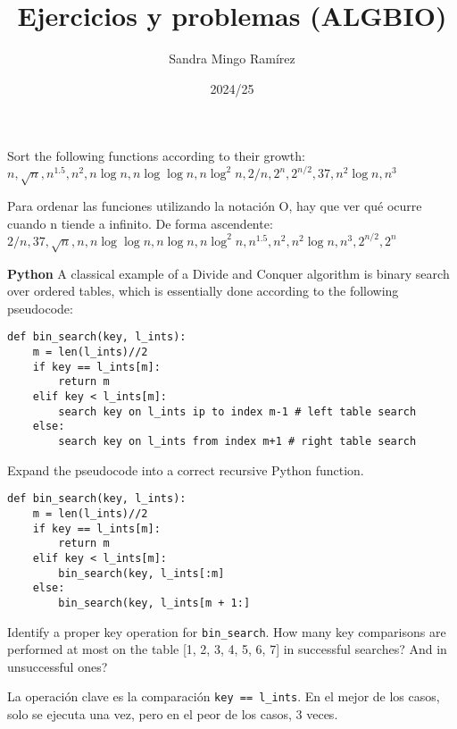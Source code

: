 \documentclass[nochap]{config/ejercicios}
\title{Ejercicios y problemas (ALGBIO)}
\author{Sandra Mingo Ramírez}
\date{2024/25}
\begin{document}
\maketitle

\begin{problemS}
Sort the following functions according to their growth: \\
$n, \sqrt{n}, n^{1.5}, n^2, n \log n, n \log \log n, n \log^2 n, 2/n, 2^n, 2^{n/2}, 37, n^2 \log n, n^3$

Para ordenar las funciones utilizando la notación O, hay que ver qué ocurre cuando n tiende a infinito. De forma ascendente: \\
$2/n, 37,\sqrt{n}, n, n \log \log n, n \log n, n \log^2 n, n^{1.5}, n^2, n^2 \log n, n^3, 2^{n/2}, 2^n$
\end{problemS}

\begin{problemS} \textbf{Python}
A classical example of a Divide and Conquer algorithm is binary search over ordered tables, which is essentially done according to the following pseudocode:
\begin{lstlisting}
def bin_search(key, l_ints):
	m = len(l_ints)//2
	if key == l_ints[m]:
		return m
	elif key < l_ints[m]:
		search key on l_ints ip to index m-1 # left table search
	else:
		search key on l_ints from index m+1 # right table search
\end{lstlisting}

Expand the pseudocode into a correct recursive Python function.
\begin{lstlisting}
def bin_search(key, l_ints):
	m = len(l_ints)//2
	if key == l_ints[m]:
		return m
	elif key < l_ints[m]:
		bin_search(key, l_ints[:m]
	else:
		bin_search(key, l_ints[m + 1:]
\end{lstlisting}
\end{problemS}

\begin{problemS}
Identify a proper key operation for \texttt{bin\_search}. How many key comparisons are performed at most on the table [1, 2, 3, 4, 5, 6, 7] in successful searches? And in unsuccessful ones?

La operación clave es la comparación \texttt{key == l\_ints}. En el mejor de los casos, solo se ejecuta una vez, pero en el peor de los casos, 3 veces.
\end{problemS}
\end{document}
